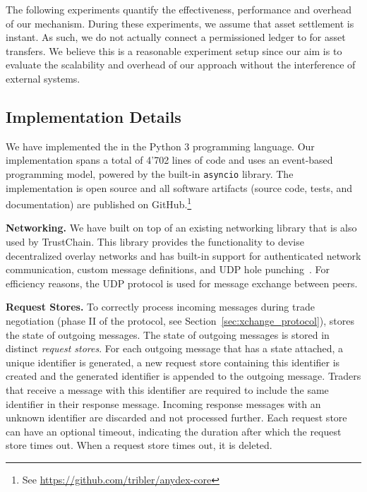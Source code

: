 The following experiments quantify the effectiveness, performance and overhead of our \ModelName{} mechanism.
During these experiments, we assume that asset settlement is instant.
As such, we do not actually connect a permissioned ledger to \ModelName{} for asset transfers.
We believe this is a reasonable experiment setup since our aim is to evaluate the scalability and overhead of our approach without the interference of external systems.

\subsection{Implementation Details}
\label{sec:implementation}
We have implemented the \ModelName{} in the Python 3 programming language.
Our implementation spans a total of 4'702 lines of code and uses an event-based programming model, powered by the built-in \texttt{asyncio} library.
The implementation is open source and all software artifacts (source code, tests, and documentation) are published on GitHub.\footnote{See \url{https://github.com/tribler/anydex-core}}

\textbf{Networking.}
We have built \ModelName{} on top of an existing networking library that is also used by TrustChain.
This library provides the functionality to devise decentralized overlay networks and has built-in support for authenticated network communication, custom message definitions, and UDP hole punching~\cite{ipv8}.
For efficiency reasons, the UDP protocol is used for message exchange between peers.

\textbf{Request Stores.}
To correctly process incoming messages during trade negotiation (phase II of the \ModelName{} protocol, see Section~\ref{sec:xchange_protocol}), \ModelName{} stores the state of outgoing messages.
The state of outgoing messages is stored in distinct \emph{request stores}.
For each outgoing message that has a state attached, a unique identifier is generated, a new request store containing this identifier is created and the generated identifier is appended to the outgoing message.
Traders that receive a message with this identifier are required to include the same identifier in their response message.
Incoming response messages with an unknown identifier are discarded and not processed further.
Each request store can have an optional timeout, indicating the duration after which the request store times out.
When a request store times out, it is deleted.

